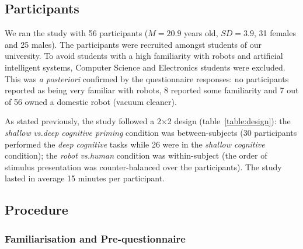\documentclass[lettersize, noapacite, twoside, HRI]{apa_HRI}
\newcommand{\vs}{\textit{vs.}\xspace}
\begin{document}
%
%
%
%

\subsection{Participants}

We ran the study with 56 participants ($M = 20.9$ years old, $SD = 3.9$, 31 females and
25 males).  The participants were recruited amongst students of our university.
To avoid students with a high familiarity with robots and artificial intelligent
systems, Computer Science and Electronics students were excluded. This was
\textit{a posteriori} confirmed by the questionnaire responses: no participants
reported as being very familiar with robots, 8 reported some familiarity
and 7 out of 56 owned a domestic robot (vacuum cleaner).

As stated previously, the study followed a 2$\times$2 design
(table~\ref{table:design}): the \emph{shallow} \vs \emph{deep cognitive priming}
condition was between-subjects (30 participants performed the \emph{deep cognitive}
tasks while 26 were in the \emph{shallow cognitive} condition); the \emph{robot}
\vs \emph{human} condition was within-subject (the order of stimulus presentation
was counter-balanced over the participants). The study lasted in average 15
minutes per participant.

\subsection{Procedure}

\subsubsection{Familiarisation and Pre-questionnaire}
\end{document}

